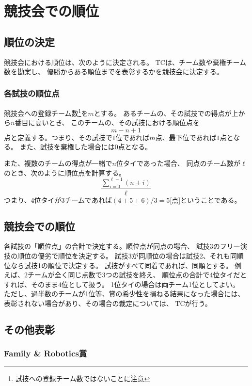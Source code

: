 \documentclass[a4j]{jarticle}
\begin{document}
\section{競技会での順位}

\subsection{順位の決定}

競技会における順位は、次のように決定される。
TCは、チーム数や棄権チーム数を勘案し、
優勝からある順位までを表彰するかを競技会に決定する。

\subsubsection{各試技の順位点}\label{sub:testrank}

競技会への登録チーム数\footnote{試技への登録チーム数ではないことに注意}を$m$とする。
あるチームの、その試技での得点が上から$n$番目に高いとき、
このチームの、その試技における順位点を
\[
	m - n + 1
\]
点と定義する。つまり、その試技で$1$位であれば$m$点、最下位であれば$1$点となる。
また、試技を棄権した場合には$0$点となる。

また、複数のチームの得点が一緒で$n$位タイであった場合、
同点のチーム数が$\ell$のとき、次のように順位点を計算する。
\[
	\dfrac{\sum_{i=0}^{\ell-1}(n + i)}{\ell}
\]
つまり、4位タイが3チームであれば$(4+5+6)/3=5$[点]ということである。


\subsection{競技会での順位}

各試技の「順位点」の合計で決定する。順位点が同点の場合、
試技3のフリー演技の順位の優劣で順位を決定する。
試技3が同順位の場合は試技2、それも同順位なら試技1の順位で決定する。
試技がすべて同着であれば、同順とする。
例えば、2チームが全く同じ点数で3つの試技を終え、
順位点の合計で4位タイだとすれば、そのまま4位として扱う。
1位タイの場合は両チーム1位としてよい。
ただし、過半数のチームが1位等、賞の希少性を損ねる結果になった場合には、
表彰されない場合があり、その場合の裁定については、
TCが行う。

\subsection{その他表彰}

\subsubsection{Family \& Robotics賞}
\end{document}
